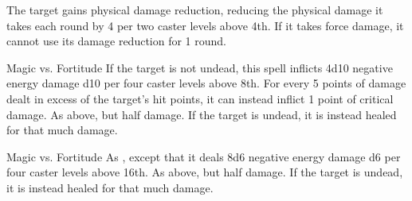 \begin{spellheader}
    \spellrng{\rngclose}
    \spelldur{\durshort}
\end{spellheader}
\begin{spelleffects}
    \spelleffect The target gains physical damage reduction, reducing the physical damage it takes each round by 4  per two caster levels above 4th. If it takes force damage, it cannot use its damage reduction for 1 round.
\end{spelleffects}
\begin{spellfooter}

\end{spellfooter}

\begin{spellheader}
    \spellrng{\rngclose}
\end{spellheader}
\begin{spelleffects}
    \begin{spellattack}{Magic vs. Fortitude}
        \spellsuccess If the target is not undead, this spell inflicts 4d10 negative energy damage \add d10 per four caster levels above 8th. For every 5 points of damage dealt in excess of the target's hit points, it can instead inflict 1 point of critical damage.
        \spellfailure As above, but half damage.
        \spelleffect If the target is undead, it is instead healed for that much damage.
    \end{spellattack}
\end{spelleffects}
\begin{spellfooter}

\end{spellfooter}

\begin{spellheader}
\end{spellheader}
\begin{spelleffects}
    \begin{spellattack}{Magic vs. Fortitude}
        \spellsuccess As , except that it deals 8d6 negative energy damage \add d6 per four caster levels above 16th.
        \spellfailure As above, but half damage.
        \spelleffect If the target is undead, it is instead healed for that much damage.
    \end{spellattack}
\end{spelleffects}
\begin{spellfooter}

\end{spellfooter}

